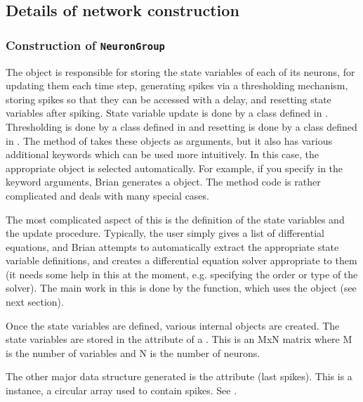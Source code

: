 \documentclass[letterpaper,10pt,english]{manual}
\begin{document}
\subsection{Details of network construction}


\subsubsection{Construction of \texttt{NeuronGroup}}

The  object is responsible for storing the state variables
of each of its neurons, for updating them each time step, generating spikes
via a thresholding mechanism, storing spikes so that they can be accessed with
a delay, and resetting state variables after spiking. State variable update
is done by a  class defined in .
Thresholding is done by a  class defined in
 and resetting is done by a  class defined
in . The  method of  takes
these objects as arguments, but it also has various additional keywords which
can be used more intuitively. In this case, the appropriate object is selected
automatically. For example, if you specify  in the keyword
arguments, Brian generates a  object. The
 method code is rather complicated and deals with
many special cases.

The most complicated aspect of this is the definition of the state variables and
the update procedure. Typically, the user simply gives a list of differential
equations, and Brian attempts to automatically extract the appropriate state
variable definitions, and creates a differential equation solver appropriate to
them (it needs some help in this at the moment, e.g. specifying the order or
type of the solver). The main work in this is done by the
 function, which uses the
 object (see next section).

Once the state variables are defined, various internal objects are created.
The state variables are stored in the  attribute of a .
This is an MxN matrix where M is the number of variables and N is the number
of neurons.

The other major data structure generated is the  attribute (last spikes).
This is a  instance, a circular array used to contain spikes.
See .
\end{document}
